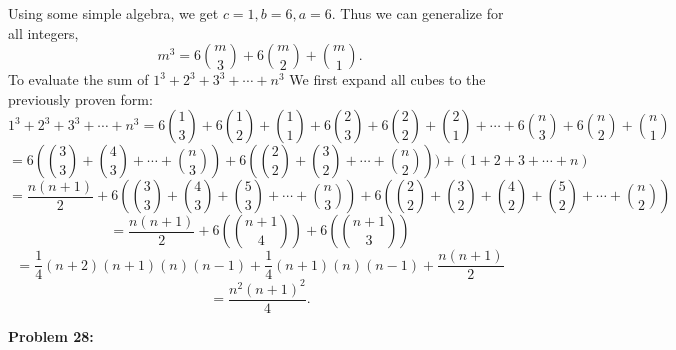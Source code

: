 \documentclass[12pt]{article}
\begin{document}
Using some simple algebra, we get $c = 1, b = 6, a = 6$. Thus we can generalize for all integers, 
\[
	m^3 = 6\binom{m}{3} + 6\binom{m}{2} + \binom{m}{1} 
.\] 
To evaluate the sum of $1^3 + 2^3 + 3^3 + \cdots + n^3$ We first expand all cubes to the previously
proven form: 
\[
	1^3 + 2^3 + 3^3 + \cdots + n^3 = 6\binom{1}{3} + 6\binom{1}{2} + \binom{1}{1} + 6\binom{2}{3} + 6\binom{2}{2} + \binom{2}{1} + \cdots + 6\binom{n}{3} + 6\binom{n}{2} + \binom{n}{1}
\]
\[
	= 6(\binom{3}{3} + \binom{4}{3} + \cdots + \binom{n}{3}) + 6(\binom{2}{2} + \binom{3}{2} + \cdots + \binom{n}{2})) + (1 + 2 + 3 + \cdots + n)		
\]
\[
	= \frac{n(n+1)}{2} + 6(\binom{3}{3} + \binom{4}{3} + \binom{5}{3} + \cdots + \binom{n}{3}) + 6(\binom{2}{2} + \binom{3}{2} + \binom{4}{2} + \binom{5}{2} + \cdots + \binom{n}{2})

\] 
\[
	= \frac{n(n+1)}{2} + 6(\binom{n+1}{4}) + 6(\binom{n+1}{3})
\]
\[
	= \frac{1}{4}(n+2)(n+1)(n)(n-1) + \frac{1}{4}(n+1)(n)(n-1) + \frac{n(n+1)}{2}
\] 
\[
	= \frac{n^{2}(n+1)^{2}}{4}
.\] 

\noindent
\textbf{Problem 28: }

\begin{equation}
	
\end{equation}
\end{document}
